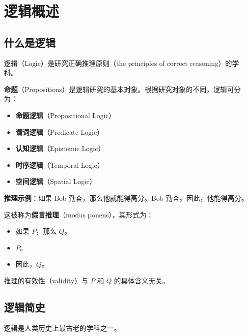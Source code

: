 \documentclass[UTF8,11pt,a4paper]{ctexbook}   %
\theoremstyle{definition}
\begin{document}
\section{逻辑概述}

\subsection{什么是逻辑}

逻辑（Logic）是研究正确推理原则（the principles of correct reasoning）的学科。

\textbf{命题}（Propositions）是逻辑研究的基本对象。根据研究对象的不同，逻辑可分为：
\begin{itemize}
    \item \textbf{命题逻辑}（Propositional Logic）
    \item \textbf{谓词逻辑}（Predicate Logic）
    \item \textbf{认知逻辑}（Epistemic Logic）
    \item \textbf{时序逻辑}（Temporal Logic）
    \item \textbf{空间逻辑}（Spatial Logic）
\end{itemize}

\textbf{推理示例}：如果 Bob 勤奋，那么他就能得高分。Bob 勤奋。因此，他能得高分。

这被称为\textbf{假言推理}（modus ponens），其形式为：
\begin{itemize}
    \item 如果 $P$，那么 $Q$。
    \item $P$。
    \item 因此，$Q$。
\end{itemize}

推理的有效性（validity）与 $P$ 和 $Q$ 的具体含义无关。

\subsection{逻辑简史}

逻辑是人类历史上最古老的学科之一。
\end{document}

